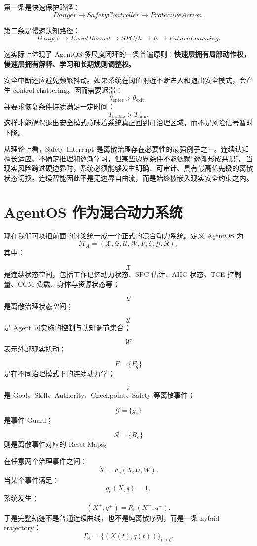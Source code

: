 第一条是快速保护路径：
\[
Danger
\rightarrow
SafetyController
\rightarrow
ProtectiveAction.
\]

第二条是慢速认知路径：
\[
Danger
\rightarrow
EventRecord
\rightarrow
SPC/h
\rightarrow
E
\rightarrow
FutureLearning.
\]

这实际上体现了 AgentOS 多尺度闭环的一条普遍原则：\textbf{快速层拥有局部动作权，慢速层拥有解释、学习和长期规则调整权。}

安全中断还应避免频繁抖动。如果系统在阈值附近不断进入和退出安全模式，会产生 control chattering。因而需要迟滞：
\[
\theta_{\mathrm{enter}}
>
\theta_{\mathrm{exit}},
\]
并要求恢复条件持续满足一定时间：
\[
T_{\mathrm{stable}}>T_{\min}.
\]
这样才能确保退出安全模式意味着系统真正回到可治理区域，而不是风险信号暂时下降。

从理论上看，Safety Interrupt 是离散治理存在必要性的最强例子之一。连续认知擅长适应、不确定推理和逐渐学习，但某些边界条件不能依赖“逐渐形成共识”。当现实风险跨过硬边界时，系统必须能够发生明确、可审计、具有最高优先级的离散状态切换。连续智能因此不是无边界自由流，而是始终被嵌入现实安全约束之内。

\section{AgentOS 作为混合动力系统}

现在我们可以把前面的讨论统一成一个正式的混合动力系统。定义 AgentOS 为
\[
\mathcal H_A
=
(
\mathcal X,
\mathcal Q,
\mathcal U,
\mathcal W,
F,
\mathcal E,
\mathcal G,
\mathcal R
),
\]
其中：

\[
\mathcal X
\]
是连续状态空间，包括工作记忆动力状态、SPC 估计、AHC 状态、TCE 控制量、CCM 负载、身体与资源状态等；

\[
\mathcal Q
\]
是离散治理状态空间；

\[
\mathcal U
\]
是 Agent 可实施的控制与认知调节集合；

\[
\mathcal W
\]
表示外部现实扰动；

\[
F=\{F_q\}
\]
是在不同治理模式下的连续动力学；

\[
\mathcal E
\]
是 Goal、Skill、Authority、Checkpoint、Safety 等离散事件；

\[
\mathcal G=\{g_e\}
\]
是事件 Guard；

\[
\mathcal R=\{R_e\}
\]
则是离散事件对应的 Reset Maps。

在任意两个治理事件之间：
\[
\dot X
=
F_q(X,U,W).
\]
当某个事件满足：
\[
g_e(X,q)=1,
\]
系统发生：
\[
(X^+,q^+)
=
R_e(X^-,q^-).
\]
于是完整轨迹不是普通连续曲线，也不是纯离散序列，而是一条 hybrid trajectory：
\[
\Gamma_A
=
\{
(X(t),q(t))
\}_{t\ge0}.
\]


